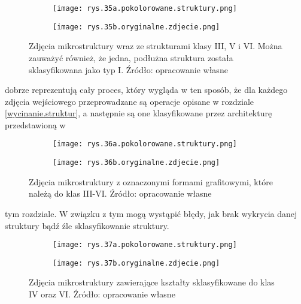 \begin{figure}[h]
	\centering
	\begin{subfigure}{0.42\textwidth}
	    \centering
	    \texttt{[image: rys.35a.pokolorowane.struktury.png]}
	\end{subfigure}
	\begin{subfigure}{0.42\textwidth}
	    \centering
	    \texttt{[image: rys.35b.oryginalne.zdjecie.png]}
	\end{subfigure}
	\caption{\label{rys.35}Zdjęcia mikrostruktury wraz ze strukturami klasy III, V i VI. Można zauważyć również, że jedna, podłużna struktura została sklasyfikowana jako typ I. Źródło: opracowanie własne}
\end{figure}
dobrze reprezentują cały proces, który wygląda w ten sposób, że dla każdego zdjęcia wejściowego przeprowadzane są operacje opisane w rozdziale \ref{wycinanie.struktur}, a następnie są one klasyfikowane przez architekturę przedstawioną w 
\begin{figure}[h]
	\centering
	\begin{subfigure}{0.41\textwidth}
	    \centering
	    \texttt{[image: rys.36a.pokolorowane.struktury.png]}
	\end{subfigure}
	\begin{subfigure}{0.41\textwidth}
	    \centering
	    \texttt{[image: rys.36b.oryginalne.zdjecie.png]}
	\end{subfigure}
	\caption{\label{rys.36}Zdjęcia mikrostruktury z oznaczonymi formami grafitowymi, które należą do klas III-VI. Źródło: opracowanie własne}
\end{figure}
tym rozdziale. W związku z tym mogą wystąpić błędy, jak brak wykrycia danej struktury bądź źle sklasyfikowanie struktury.
\begin{figure}[h]
	\centering
	\begin{subfigure}{0.41\textwidth}
	    \centering
	    \texttt{[image: rys.37a.pokolorowane.struktury.png]}
	\end{subfigure}
	\begin{subfigure}{0.41\textwidth}
	    \centering
	    \texttt{[image: rys.37b.oryginalne.zdjecie.png]}
	\end{subfigure}
	\caption{\label{rys.37}Zdjęcia mikrostruktury zawierające kształty sklasyfikowane do klas IV oraz VI. Źródło: opracowanie własne}
\end{figure}
